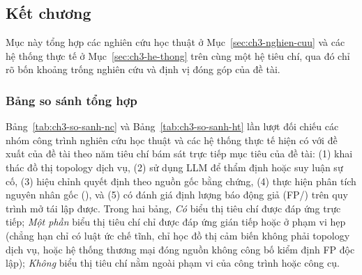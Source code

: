 \subsection{Kết chương}
\label{sec:ch3-ket-chuong}

Mục này tổng hợp các nghiên cứu học thuật ở Mục~\ref{sec:ch3-nghien-cuu} và các hệ thống thực tế ở Mục~\ref{sec:ch3-he-thong} trên cùng một hệ tiêu chí, qua đó chỉ rõ bốn khoảng trống nghiên cứu và định vị đóng góp của đề tài.

\subsubsection{Bảng so sánh tổng hợp}
\label{sec:ch3-bang-so-sanh}

Bảng~\ref{tab:ch3-so-sanh-nc} và Bảng~\ref{tab:ch3-so-sanh-ht} lần lượt đối chiếu các nhóm công trình nghiên cứu học thuật và các hệ thống thực tế hiện có với đề xuất của đề tài theo năm tiêu chí bám sát trực tiếp mục tiêu của đề tài: (1) khai thác đồ thị topology dịch vụ, (2) sử dụng LLM để thẩm định hoặc suy luận sự cố, (3) hiệu chỉnh quyết định theo nguồn gốc bằng chứng, (4) thực hiện phân tích nguyên nhân gốc (), và (5) có đánh giá định lượng báo động giả (FP/) trên quy trình mở tái lập được. Trong hai bảng, \emph{Có} biểu thị tiêu chí được đáp ứng trực tiếp; \emph{Một phần} biểu thị tiêu chí chỉ được đáp ứng gián tiếp hoặc ở phạm vi hẹp (chẳng hạn chỉ có luật ức chế tĩnh, chỉ học đồ thị cảm biến không phải topology dịch vụ, hoặc hệ thống thương mại đóng nguồn không công bố kiểm định FP độc lập); \emph{Không} biểu thị tiêu chí nằm ngoài phạm vi của công trình hoặc công cụ.

